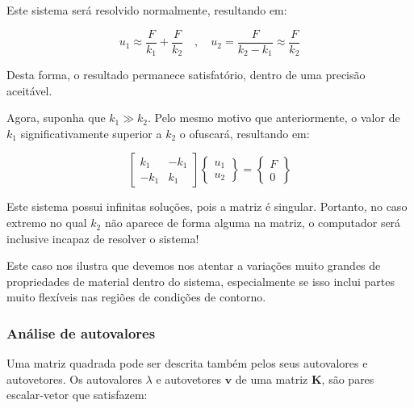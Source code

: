             Este sistema será resolvido normalmente, resultando em:

            \begin{equation}
                u_1 \approx \frac{F}{k_1} + \frac{F}{k_2} \quad , \quad  
                u_2 = \frac{F}{k_2-k_1} \approx \frac{F}{k_2}
            \end{equation}

            Desta forma, o resultado permanece satisfatório, dentro de uma precisão aceitável.

            Agora, suponha que $k_1 \gg k_2$. Pelo mesmo motivo que anteriormente, o valor de $k_1$ significativamente superior a $k_2$ o ofuscará, resultando em:

            \begin{equation}
                \begin{bmatrix}
                    k_1 & -k_1\\
                    -k_1 & k_1
                \end{bmatrix}
                \begin{Bmatrix}
                    u_1\\
                    u_2
                \end{Bmatrix}
                =
                \begin{Bmatrix}
                    F\\
                    0
                \end{Bmatrix}
            \end{equation}

            Este sistema possui infinitas soluções, pois a matriz é singular. Portanto, no caso extremo no qual $k_2$ não aparece de forma alguma na matriz, o computador será inclusive incapaz de resolver o sistema!

            Este caso nos ilustra que devemos nos atentar a variações muito grandes de propriedades de material dentro do sistema, especialmente se isso inclui partes muito flexíveis nas regiões de condições de contorno.

        \subsubsection*{Análise de autovalores}

            Uma matriz quadrada pode ser descrita também pelos seus autovalores e autovetores. Os autovalores $\lambda$ e autovetores $\bm{v}$ de uma matriz $\bm{K}$, são pares escalar-vetor que satisfazem:

